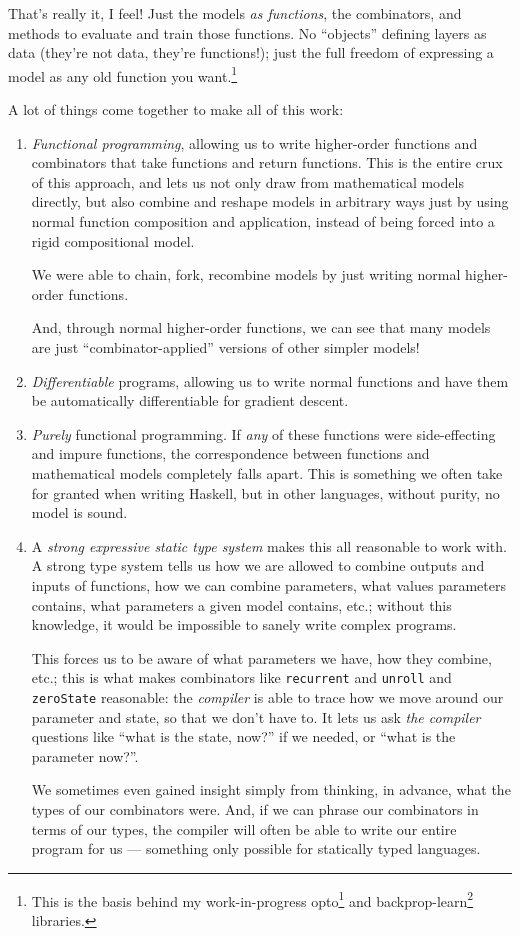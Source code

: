 \documentclass[]{article}
\renewcommand{\href}[2]{#2\footnote{\url{#1}}}
\begin{document}
That's really it, I feel! Just the models \emph{as functions}, the combinators,
and methods to evaluate and train those functions. No ``objects'' defining
layers as data (they're not data, they're functions!); just the full freedom of
expressing a model as any old function you want.\footnote{This is the basis
  behind my work-in-progress \href{https://github.com/mstksg/opto}{opto} and
  \href{https://github.com/mstksg/backprop-learn}{backprop-learn} libraries.}

A lot of things come together to make all of this work:

\begin{enumerate}
\def\labelenumi{\arabic{enumi}.}
\item
  \emph{Functional programming}, allowing us to write higher-order functions and
  combinators that take functions and return functions. This is the entire crux
  of this approach, and lets us not only draw from mathematical models directly,
  but also combine and reshape models in arbitrary ways just by using normal
  function composition and application, instead of being forced into a rigid
  compositional model.

  We were able to chain, fork, recombine models by just writing normal
  higher-order functions.

  And, through normal higher-order functions, we can see that many models are
  just ``combinator-applied'' versions of other simpler models!
\item
  \emph{Differentiable} programs, allowing us to write normal functions and have
  them be automatically differentiable for gradient descent.
\item
  \emph{Purely} functional programming. If \emph{any} of these functions were
  side-effecting and impure functions, the correspondence between functions and
  mathematical models completely falls apart. This is something we often take
  for granted when writing Haskell, but in other languages, without purity, no
  model is sound.
\item
  A \emph{strong expressive static type system} makes this all reasonable to
  work with. A strong type system tells us how we are allowed to combine outputs
  and inputs of functions, how we can combine parameters, what values parameters
  contains, what parameters a given model contains, etc.; without this
  knowledge, it would be impossible to sanely write complex programs.

  This forces us to be aware of what parameters we have, how they combine, etc.;
  this is what makes combinators like \texttt{recurrent} and \texttt{unroll} and
  \texttt{zeroState} reasonable: the \emph{compiler} is able to trace how we
  move around our parameter and state, so that we don't have to. It lets us ask
  \emph{the compiler} questions like ``what is the state, now?'' if we needed,
  or ``what is the parameter now?''.

  We sometimes even gained insight simply from thinking, in advance, what the
  types of our combinators were. And, if we can phrase our combinators in terms
  of our types, the compiler will often be able to write our entire program for
  us --- something only possible for statically typed languages.
\end{enumerate}
\end{document}
